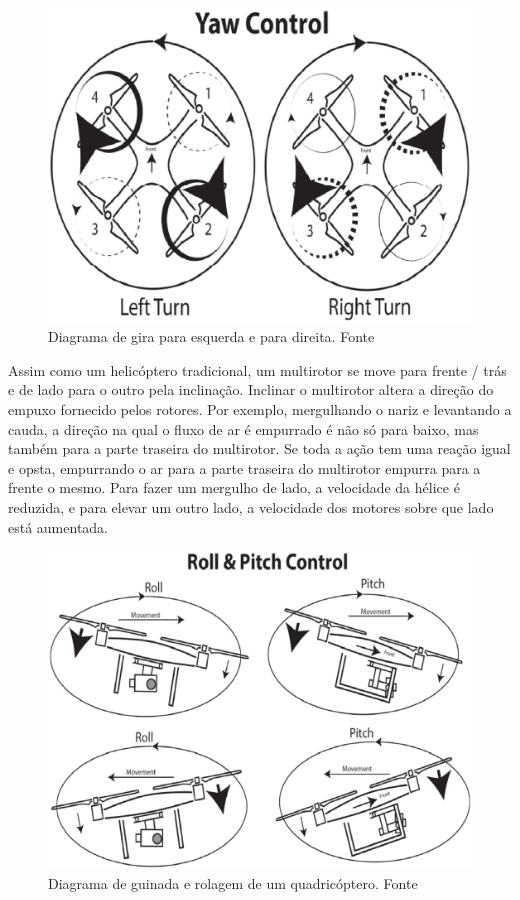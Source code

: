 \begin{figure}[h!]
    \centering
      \includegraphics[keepaspectratio=true,scale=0.5]{figuras/gira.eps}
    \caption{Diagrama de gira para esquerda e para direita. Fonte \cite{audronis}}
    \label{fig:gira}
\end{figure}

Assim como um helicóptero tradicional, um multirotor se move para frente / trás e de lado para o outro pela inclinação. Inclinar o multirotor altera a direção do empuxo fornecido pelos rotores. Por exemplo, mergulhando o nariz e levantando a cauda, a direção na qual o fluxo de ar é empurrado é não só para baixo, mas também para a parte traseira do multirotor. Se toda a ação tem uma reação igual e opsta, empurrando o ar para a parte traseira do multirotor empurra para a frente o mesmo. Para fazer um mergulho de lado, a velocidade da hélice é reduzida, e para elevar um outro lado, a velocidade dos motores sobre que lado está aumentada.


\begin{figure}[h!]
    \centering
      \includegraphics[keepaspectratio=true,scale=0.5]{figuras/guinada.eps}
    \caption{Diagrama de guinada e rolagem de um quadricóptero. Fonte \cite{audronis}}
    \label{fig:guinada}
\end{figure}

